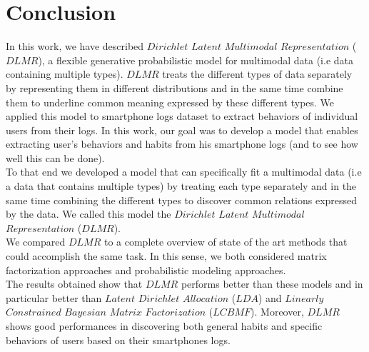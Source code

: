 
\chapter{Conclusion} %

\label{Chapter7} %


In this work, we have described $Dirichlet$ $Latent$ $Multimodal$ $Representation$ ($DLMR$), a flexible generative probabilistic model for multimodal data (i.e data containing multiple types). $DLMR$ treats the different types of data separately by representing them in different distributions and in the same time combine them to underline common meaning expressed by these different types. We applied this model to smartphone logs dataset to extract behaviors of individual users from their logs.
In this work, our goal was to develop a model that enables extracting user's behaviors and habits from his smartphone logs (and to see how well this can be done).
\\To that end we developed a model that can specifically fit a multimodal data (i.e a data that contains multiple types) by treating each type separately and in the same time combining the different types to discover common relations expressed by the data. We called this model the $Dirichlet$ $Latent$ $Multimodal$ $Representation$ ($DLMR$).
\\We compared $DLMR$ to a complete overview of state of the art methods that could accomplish the same task. In this sense, we both considered matrix factorization approaches and probabilistic modeling approaches.
\\The results obtained show that $DLMR$ performs better than these models and in particular better than $Latent$ $Dirichlet$ $Allocation$ ($LDA$) and $Linearly$ $Constrained$ $Bayesian$ $Matrix$ $Factorization$ ($LCBMF$). Moreover, $DLMR$ shows good performances in discovering both general habits and specific behaviors of users based on their smartphones logs. \par

